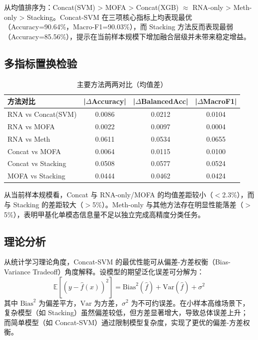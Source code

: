 从均值排序为：Concat(SVM) > MOFA > Concat(XGB) $\approx$ RNA-only > Meth-only > Stacking。Concat-SVM 在三项核心指标上均表现最优（Accuracy=90.64\%，Macro-F1=90.03\%），而 Stacking 方法反而表现最弱（Accuracy=85.56\%），提示在当前样本规模下增加融合层级并未带来稳定增益。

\subsection{多指标置换检验}

\begin{table}[H]
\centering
\caption{主要方法两两对比（均值差）}
\label{tab:permtest-all}
\begin{tabular}{lccc}
\toprule
方法对比 & |$\Delta$Accuracy| & |$\Delta$BalancedAcc| & |$\Delta$MacroF1| \\
\midrule
RNA vs Concat(SVM) & 0.0086 & 0.0212 & 0.0104 \\
RNA vs MOFA & 0.0022 & 0.0097 & 0.0004 \\
RNA vs Meth & 0.0611 & 0.0534 & 0.0655 \\
Concat vs MOFA & 0.0064 & 0.0115 & 0.0100 \\
Concat vs Stacking & 0.0508 & 0.0577 & 0.0524 \\
MOFA vs Stacking & 0.0444 & 0.0462 & 0.0424 \\
\bottomrule
\end{tabular}
\end{table}

从当前样本规模看，Concat 与 RNA-only/MOFA 的均值差距较小（$<$2.3\%），而与 Stacking 的差距较大（$>$5\%）。Meth-only 与其他方法存在明显性能落差（$>$5\%），表明甲基化单模态信息量不足以独立完成高精度分类任务。

\subsection{理论分析}

从统计学习理论角度，Concat-SVM 的最优性能可从偏差-方差权衡（Bias-Variance Tradeoff）角度解释。设模型的期望泛化误差可分解为：
\[
\mathbb{E}[(y - \hat{f}(x))^2] = \mathrm{Bias}^2(\hat{f}) + \mathrm{Var}(\hat{f}) + \sigma^2
\]
其中 $\mathrm{Bias}^2$ 为偏差平方，$\mathrm{Var}$ 为方差，$\sigma^2$ 为不可约误差。在小样本高维场景下，复杂模型（如 Stacking）虽然偏差较低，但方差显著增大，导致总体误差上升；而简单模型（如 Concat-SVM）通过限制模型复杂度，实现了更优的偏差-方差权衡。
